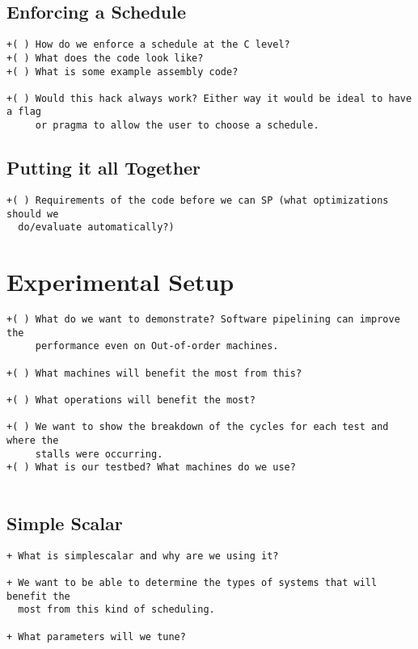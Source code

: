\documentclass[12pt]{article}
\begin{document}
\subsection{Enforcing a Schedule}
\begin{verbatim}
+( ) How do we enforce a schedule at the C level?
+( ) What does the code look like?
+( ) What is some example assembly code?

+( ) Would this hack always work? Either way it would be ideal to have a flag
     or pragma to allow the user to choose a schedule.

\end{verbatim}


\subsection{Putting it all Together}
\begin{verbatim}
+( ) Requirements of the code before we can SP (what optimizations should we
  do/evaluate automatically?)

\end{verbatim}



\section{Experimental Setup}
\begin{verbatim}
+( ) What do we want to demonstrate? Software pipelining can improve the
     performance even on Out-of-order machines.

+( ) What machines will benefit the most from this?

+( ) What operations will benefit the most?

+( ) We want to show the breakdown of the cycles for each test and where the
     stalls were occurring.
+( ) What is our testbed? What machines do we use?


\end{verbatim}

\subsection{Simple Scalar}
\begin{verbatim}
+ What is simplescalar and why are we using it?

+ We want to be able to determine the types of systems that will benefit the
  most from this kind of scheduling.

+ What parameters will we tune?

\end{verbatim}
\end{document}
